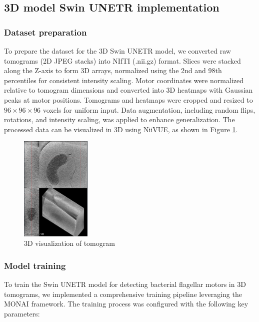 \documentclass{article}
\begin{document}
\subsection{3D model Swin UNETR implementation}

\subsubsection{Dataset preparation}
To prepare the dataset for the 3D Swin UNETR model, we converted raw tomograms (2D JPEG stacks) into NIfTI (.nii.gz) format. Slices were stacked along the Z-axis to form 3D arrays, normalized using the 2nd and 98th percentiles for consistent intensity scaling. Motor coordinates were normalized relative to tomogram dimensions and converted into 3D heatmaps with Gaussian peaks at motor positions. Tomograms and heatmaps were cropped and resized to \(96 \times 96 \times 96\) voxels for uniform input. Data augmentation, including random flips, rotations, and intensity scaling, was applied to enhance generalization. The processed data can be visualized in 3D using NiiVUE, as shown in Figure \ref{fig:3d_visualization}.

\begin{figure}[htb]
    \centering
    \includegraphics[width=0.3\textwidth]{images/3D view of tomogram.png}
    \caption{3D visualization of tomogram}
    \label{fig:3d_visualization}
\end{figure}

\subsubsection{Model training}
To train the Swin UNETR model for detecting bacterial flagellar motors in 3D tomograms, we implemented a comprehensive training pipeline leveraging the MONAI framework\cite{Cardoso2022MONAIAO}. The training process was configured with the following key parameters:
\end{document}
